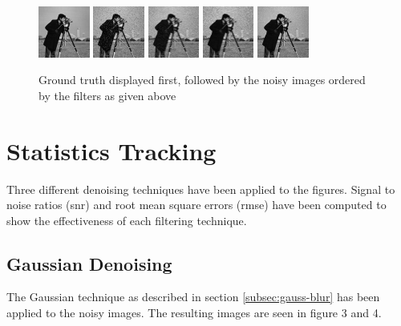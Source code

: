 \documentclass{article}
\begin{document}
\begin{figure}[H]
  \centering
  \includegraphics[width=0.15\textwidth]{images/camera_truth}
  \includegraphics[width=0.15\textwidth]{images/camera_noisy1}
  \includegraphics[width=0.15\textwidth]{images/camera_noisy2}
  \includegraphics[width=0.15\textwidth]{images/camera_noisy3}
  \includegraphics[width=0.15\textwidth]{images/camera_noisy4}
  \caption{Ground truth displayed first, followed by the noisy
    images ordered by the filters as given above}
\end{figure}   
% 
\section{Statistics Tracking}
\label{sec:stats-tracking}
% 
Three different denoising techniques have been applied to the
figures. Signal to noise ratios (snr) and root mean
square errors (rmse) have been computed to show the effectiveness of each
filtering technique.
% 
\subsection{Gaussian Denoising}
\label{subsec:gauss-denoise}
The Gaussian technique as described in section \ref{subsec:gauss-blur} has been applied
to the noisy images. The resulting images are seen in figure 3 and 4.
\end{document}
